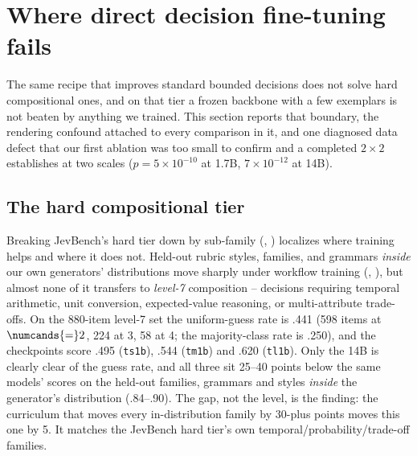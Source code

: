 \section{Where direct decision fine-tuning fails}
\label{sec:boundary}

The same recipe that improves standard bounded decisions does not solve hard compositional ones, and on
that tier a frozen backbone with a few exemplars is not beaten by anything we trained. This section
reports that boundary, the rendering confound attached to every comparison in it, and one diagnosed
data defect that our first ablation was too small to confirm and a completed $2{\times}2$ establishes
at two scales ($p{=}5\times10^{-10}$ at 1.7B, $7\times10^{-12}$ at 14B).

\subsection{The hard compositional tier}
\label{sec:boundary:hard}

Breaking JevBench's hard tier down by sub-family (, )
localizes where training helps and where it does not. Held-out rubric styles, families, and grammars
\emph{inside} our own generators' distributions move sharply under workflow training
(, ), but almost none of it transfers to \emph{level-7}
composition -- decisions requiring temporal arithmetic, unit conversion, expected-value reasoning, or
multi-attribute trade-offs. On the 880-item level-7 set the uniform-guess rate is .441 (598 items at
$\numcands{=}2$, 224 at 3, 58 at 4; the majority-class rate is .250), and the checkpoints score .495
(\texttt{ts1b}), .544 (\texttt{tm1b}) and .620 (\texttt{tl1b}). Only the 14B is clearly clear of the
guess rate, and all three sit 25--40 points below the same models' scores on the held-out families,
grammars and styles \emph{inside} the generator's distribution (.84--.90). The gap, not the level, is
the finding: the curriculum that moves every in-distribution family by 30-plus points moves this one
by 5. It matches the JevBench hard tier's own temporal/probability/trade-off families.

